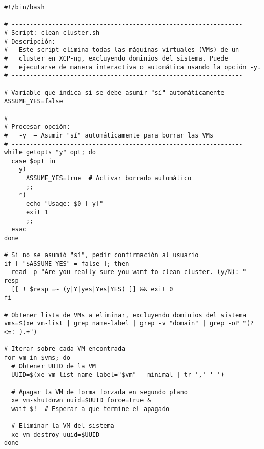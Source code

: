 \begin{verbatim}
#!/bin/bash

# ---------------------------------------------------------------
# Script: clean-cluster.sh
# Descripción:
#   Este script elimina todas las máquinas virtuales (VMs) de un 
#   cluster en XCP-ng, excluyendo dominios del sistema. Puede 
#   ejecutarse de manera interactiva o automática usando la opción -y.
# ---------------------------------------------------------------

# Variable que indica si se debe asumir "sí" automáticamente
ASSUME_YES=false

# ---------------------------------------------------------------
# Procesar opción:
#   -y  → Asumir "sí" automáticamente para borrar las VMs
# ---------------------------------------------------------------
while getopts "y" opt; do
  case $opt in
    y)
      ASSUME_YES=true  # Activar borrado automático
      ;;
    *)
      echo "Usage: $0 [-y]"
      exit 1
      ;;
  esac
done

# Si no se asumió "sí", pedir confirmación al usuario
if [ "$ASSUME_YES" = false ]; then
  read -p "Are you really sure you want to clean cluster. (y/N): " resp
  [[ ! $resp =~ (y|Y|yes|Yes|YES) ]] && exit 0
fi

# Obtener lista de VMs a eliminar, excluyendo dominios del sistema
vms=$(xe vm-list | grep name-label | grep -v "domain" | grep -oP "(?<=: ).+")

# Iterar sobre cada VM encontrada
for vm in $vms; do
  # Obtener UUID de la VM
  UUID=$(xe vm-list name-label="$vm" --minimal | tr ',' ' ')
  
  # Apagar la VM de forma forzada en segundo plano
  xe vm-shutdown uuid=$UUID force=true &
  wait $!  # Esperar a que termine el apagado
  
  # Eliminar la VM del sistema
  xe vm-destroy uuid=$UUID
done
\end{verbatim}